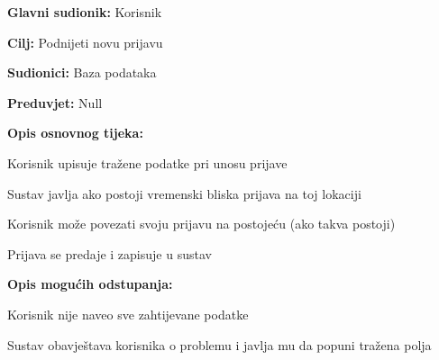 					\noindent {}
					\begin{packed_item}
	
						\item \textbf{Glavni sudionik: }Korisnik
						\item  \textbf{Cilj:} Podnijeti novu prijavu
						\item  \textbf{Sudionici:} Baza podataka
						\item  \textbf{Preduvjet:} Null
						\item  \textbf{Opis osnovnog tijeka:}
						
						\item[] \begin{packed_enum}
	
							\item Korisnik upisuje tražene podatke pri unosu prijave 
							\item Sustav javlja ako postoji vremenski bliska prijava na toj lokaciji
							\item Korisnik može povezati svoju prijavu na postojeću (ako takva postoji)
							\item Prijava se predaje i zapisuje u sustav
						\end{packed_enum}
						
						\item  \textbf{Opis mogućih odstupanja:}
						
						\item[] \begin{packed_item}
	
							\item[1.a] Korisnik nije naveo sve zahtijevane podatke
							\item[] \begin{packed_enum}
								
								\item Sustav obavještava korisnika o problemu i javlja mu da popuni tražena polja
								
							\end{packed_enum}
							
						\end{packed_item}
					\end{packed_item}
					
					\pagebreak
					

